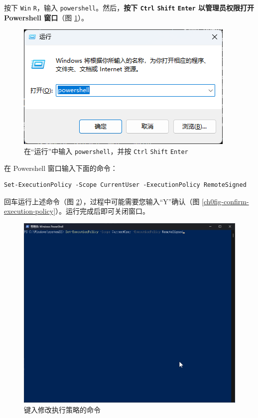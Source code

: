 按下 \lstinline{Win} \lstinline{R}，输入 \lstinline{powershell}。然后，\textbf{\color{red}按下 \lstinline{Ctrl} \lstinline{Shift} \lstinline{Enter} 以管理员权限打开 Powershell 窗口}（图 \ref{ch0fig-run-pwsh-as-admin}）。

\begin{figure}[H]
    \Centering
    \includegraphics[width=\textwidth]{assets/intro/run_pwsh_as_admin.png}
    \caption{在“运行”中输入 \lstinline{powershell}，并按 \lstinline{Ctrl} \lstinline{Shift} \lstinline{Enter}}
    \label{ch0fig-run-pwsh-as-admin}
\end{figure}

在 Powershell 窗口输入下面的命令：

\begin{verbatim}
Set-ExecutionPolicy -Scope CurrentUser -ExecutionPolicy RemoteSigned
\end{verbatim}

回车运行上述命令（图 \ref{ch0fig-change-execution-policy}），过程中可能需要您输入“Y”确认（图 \ref{ch0fig-confirm-execution-policy}）。运行完成后即可关闭窗口。

\begin{figure}[H]
    \Centering
    \includegraphics[width=\textwidth]{assets/intro/confirm_execution_policy_00.png}
    \caption{键入修改执行策略的命令}
    \label{ch0fig-change-execution-policy}
\end{figure}

